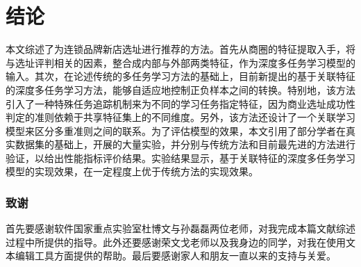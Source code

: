 \documentclass{llncs}
\begin{document}
\section{结论}
本文综述了为连锁品牌新店选址进行推荐的方法。首先从商圈的特征提取入手，将与选址评判相关的因素，整合成内部与外部两类特征，作为深度多任务学习模型的输入。其次，在论述传统的多任务学习方法的基础上，目前新提出的基于关联特征的深度多任务学习方法，能够自适应地控制正负样本之间的转换。特别地，该方法引入了一种特殊任务追踪机制来为不同的学习任务指定特征，因为商业选址成功性判定的准则依赖于共享特征集上的不同维度。另外，该方法还设计了一个关联学习模型来区分多重准则之间的联系。为了评估模型的效果，本文引用了部分学者在真实数据集的基础上，开展的大量实验，并分别与传统方法和目前最先进的方法进行验证，以给出性能指标评价结果。实验结果显示，基于关联特征的深度多任务学习模型的实现效果，在一定程度上优于传统方法的实现效果。


\subsubsection*{致谢}
首先要感谢软件国家重点实验室杜博文与孙磊磊两位老师，对我完成本篇文献综述过程中所提供的指导。此外还要感谢荣文戈老师以及我身边的同学，对我在使用文本编辑工具方面提供的帮助。最后要感谢家人和朋友一直以来的支持与关爱。


%

	
\end{document}
